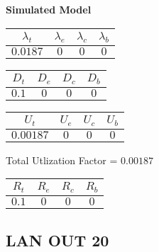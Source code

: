 \documentclass{article}
\begin{document}
\begin{minipage}{0.5\textwidth}
\centering	\textbf{Simulated Model}
\begin{table}[H]
\centering
\begin{tabular}{@{}cccc@{}}
\toprule
$\lambda_t$ & $\lambda_e$ & $\lambda_c$ & $\lambda_b$\\
\midrule
$0.0187$ & $0$ & $0$ & $0$\\
\bottomrule
\end{tabular}
\end{table}
\begin{table}[H]
\centering
\begin{tabular}{@{}cccc@{}}
\toprule
$D_t$ & $D_e$ & $D_c$ & $D_b$\\
\midrule
$0.1$ & $0$ & $0$ & $0$\\
\bottomrule
\end{tabular}
\end{table}\begin{table}[H]
\centering
\begin{tabular}{@{}cccc@{}}
\toprule
$U_t$ & $U_e$ & $U_c$ & $U_b$\\
\midrule
$0.00187$ & $0$ & $0$ & $0$\\
\bottomrule
\end{tabular}
\end{table}
\centering Total Utlization Factor = $0.00187$
\begin{table}[H]
\centering
\begin{tabular}{@{}cccc@{}}
\toprule
$R_t$ & $R_e$ & $R_c$ & $R_b$\\
\midrule
$0.1$ & $0$ & $0$ & $0$\\
\bottomrule
\end{tabular}
\end{table}
\end{minipage}\subsection{LAN OUT 20}
\end{document}
